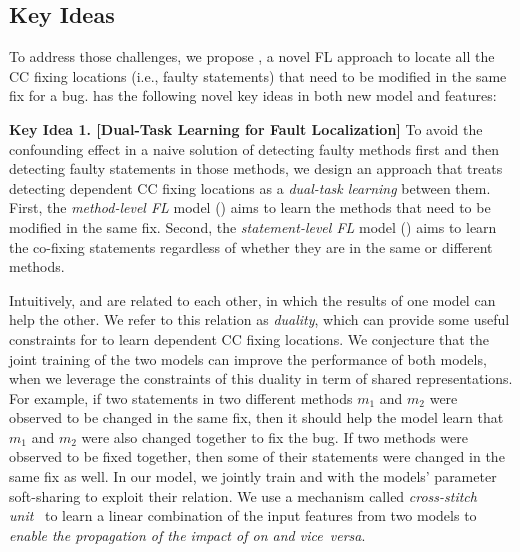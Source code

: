 \subsection{Key Ideas}
\label{sec:key-ideas}

To address those challenges, we propose {\tool}, a novel FL approach
to locate all the CC fixing locations (i.e., faulty statements) that
need to be modified in the same fix for a bug. {\tool} has the
following novel key ideas in both new model and features:

{\bf Key Idea 1. [Dual-Task Learning for Fault Localization]} To avoid the
confounding effect in a naive solution of detecting faulty methods
first and then detecting faulty statements in those methods, we design
an approach that treats detecting dependent CC fixing locations as a
{\em dual-task learning} between them. First, the {\em method-level
  FL} model () aims to learn the methods that need
to be modified in the same fix. Second, the {\em statement-level
  FL} model () aims to learn the co-fixing
statements regardless of whether they are in the same or different
methods.

Intuitively,  and  are related to each
other, in which the results of one model can help the other. We refer
to this relation as {\em duality}, which can provide some useful
constraints for {\tool} to learn dependent CC fixing locations.
%
We conjecture that the joint training of the two models can improve
the performance of both models, when we leverage the constraints of
this duality in term of shared representations. For example, if two
statements in two different methods $m_1$ and $m_2$ were observed to
be changed in the same fix, then it should help the model learn that
$m_1$ and $m_2$ were also changed together to fix the bug.  If two
methods were observed to be fixed together, then some of their
statements were changed in the same fix as well. In our model, we
jointly train  and  with the models'
parameter soft-sharing to exploit their relation. We use a mechanism
called {\em cross-stitch unit}~\cite{misra2016cross} to learn a linear
combination of the input features from two models to {\em enable
  the propagation of the impact of  on  and
  vice~versa}.




